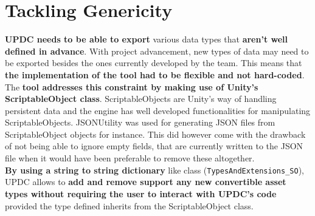 \documentclass[12pt,a4paper]{article}
\begin{document}
\section{Tackling Genericity}
\textbf{UPDC needs to be able to export} various data types that \textbf{aren't well defined in advance}. With project advancement, new types of data may need to be exported besides the ones currently developed by the team. This means that \textbf{the implementation of the tool had to be flexible and not hard-coded}.\\
The \textbf{tool addresses this constraint by making use of Unity's ScriptableObject class}. ScriptableObjects are Unity's way of handling persistent data and the engine has well developed functionalities for manipulating ScriptableObjects. JSONUtility was used for generating JSON files from ScriptableObject objects for instance. This did however come with the drawback of not being able to ignore empty fields, that are currently written to the JSON file when it would have been preferable to remove these altogether.\\
\textbf{By using a string to string dictionary} like class (\texttt{TypesAndExtensions\_SO}), UPDC allows to \textbf{add and remove support any new convertible asset types without requiring the user to interact with UPDC's code} provided the type defined inherits from the ScriptableObject class.
\end{document}
